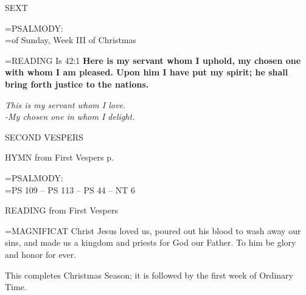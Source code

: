 \begin{flushleft}\normalsize SEXT\\\end{flushleft}

\hangindent=\parindent \small{PSALMODY:}\\
\hangindent=\parindent  of Sunday, Week III of Christmas\vspace{0.5em}

\hangindent=\parindent \small{READING}  Is 42:1 \textbf{ Here is my servant whom I uphold, my chosen one with whom I am pleased. Upon him I have put my spirit; he shall bring forth justice to the nations.}

\begin{center}
\textit{This is my servant whom I love.\\
-My chosen one in whom I delight.}
\end{center}

\begin{flushleft}\normalsize SECOND VESPERS\\\end{flushleft}

HYMN from First Vespers p. \pageref{baptism:hymn}

\hangindent=\parindent \small{PSALMODY:}\\
\hangindent=\parindent  PS 109 -- PS 113 -- PS 44 -- NT 6\vspace{0.5em}

READING from First Vespers

\hangindent=\parindent \small{MAGNIFICAT 	Christ Jesus loved us, poured out his blood to wash away our sins, and made us a kingdom and priests for God our Father. To him be glory and honor for ever.\\}

This completes Christmas Season;
it is followed by the first week of Ordinary Time.

